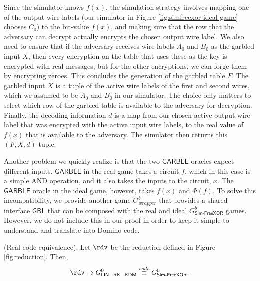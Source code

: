 Since the simulator knows $f(x)$, the simulation strategy involves mapping one of the output wire labels (our simulator in Figure \ref{fig:simfreexor-ideal-game} chooses $C_0$) to the bit-value $f(x)$, and making sure that the row that the adversary can decrypt actually encrypts the chosen output wire label. We also need to ensure that if the adversary receives wire labels $A_0$ and $B_0$ as the garbled input $X$, then every encryption on the table that uses these as the key is encrypted with real messages, but for the other encryptions, we can forge them by encrypting zeroes. This concludes the generation of the garbled table $F$. The garbled input $X$ is a tuple of the active wire labels of the first and second wires, which we assumed to be $A_0$ and $B_0$ in our simulator. The choice only matters to select which row of the garbled table is available to the adversary for decryption. Finally, the decoding information $d$ is a map from our chosen active output wire label that was encrypted with the active input wire labels, to the real value of $f(x)$ that is available to the adversary. The simulator then returns this $(F,X,d)$ tuple.



Another problem we quickly realize is that the two $\mathsf{GARBLE}$ oracles expect different inputs. $\mathsf{GARBLE}$ in the real game takes a circuit $f$, which in this case is a simple AND operation, and it also takes the inputs to the circuit, $x$. The $\mathsf{GARBLE}$ oracle in the ideal game, however, takes $f(x)$ and $\Phi(f)$. To solve this incompatibility, we provide another game $G^{b}_{wrapper}$ that provides a shared interface $\mathsf{GBL}$ that can be composed with the real and ideal $G^b_\mathsf{Sim\text{-}FreeXOR}$ games. However, we do not include this in our proof in order to keep it simple to understand and translate into Domino code.

\begin{lemma}\label{lemma:realcodeeq}\textnormal{(Real code equivalence).}
    Let $\rdv$ be the reduction defined in Figure \ref{fig:reduction}. Then, 
    \[ \rdv \to G^{0}_{\mathsf{LIN-RK-KDM}} \codeequiv G^0_{\mathsf{Sim\text{-}FreeXOR}}\text{.}
\]
\end{lemma}


